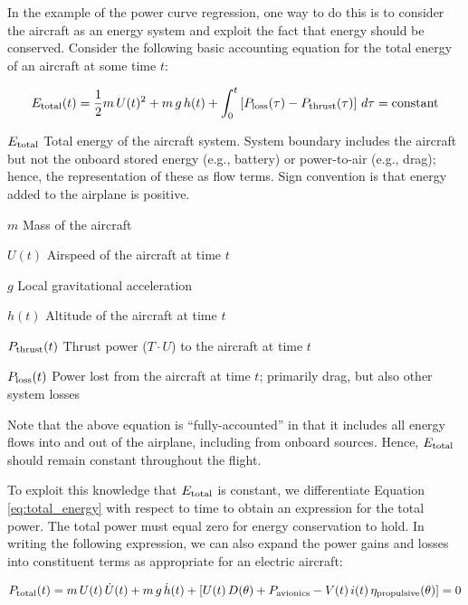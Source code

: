 \documentclass[conf]{new-aiaa}
\begin{document}
    In the example of the power curve regression, one way to do this is to consider the aircraft as an energy system and exploit the fact that energy should be conserved. Consider the following basic accounting equation for the total energy of an aircraft at some time $t$:

    \begin{equation}
        E_{\rm total}(t) =
        \frac{1}{2}m \, U(t)^2
        + m \, g \, h(t)
        + \int_0^t \left[
            P_{\rm loss}(\tau)
            - P_{\rm thrust}(\tau)
            \right] \, d\tau = \text{constant}
        \label{eq:total_energy}
    \end{equation}

    \begin{eqexpl}
        \item{$E_{\rm total}$} Total energy of the aircraft system. System boundary includes the aircraft but not the onboard stored energy (e.g., battery) or power-to-air (e.g., drag); hence, the representation of these as flow terms. Sign convention is that energy added to the airplane is positive.
        \item{$m$} Mass of the aircraft
        \item{$U(t)$} Airspeed of the aircraft at time $t$
        \item{$g$} Local gravitational acceleration
        \item{$h(t)$} Altitude of the aircraft at time $t$
        \item{$P_{\rm thrust}(t)$} Thrust power ($T \cdot U$) to the aircraft at time $t$
        \item{$P_{\rm loss}(t)$} Power lost from the aircraft at time $t$; primarily drag, but also other system losses
    \end{eqexpl}

    \noindent Note that the above equation is ``fully-accounted'' in that it includes all energy flows into and out of the airplane, including from onboard sources. Hence, $E_{\rm total}$ should remain constant throughout the flight.

    To exploit this knowledge that $E_{\rm total}$ is constant, we differentiate Equation \ref{eq:total_energy} with respect to time to obtain an expression for the total power. The total power must equal zero for energy conservation to hold. In writing the following expression, we can also expand the power gains and losses into constituent terms as appropriate for an electric aircraft:

    \begin{equation}
        P_{\rm total}(t) =
        m \, U(t) \, \dot{U}(t)
        + m \, g \, \dot{h}(t)
        + \left[
            U(t) \, D(\theta)
            + P_{\rm avionics}
            - V(t) \, i(t) \, \eta_{\rm propulsive}(\theta)
            \right] = 0
        \label{eq:total_power}
    \end{equation}
\end{document}
